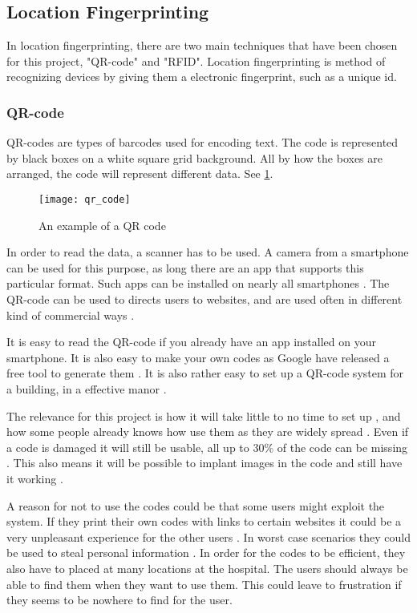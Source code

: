 \subsection{Location Fingerprinting}
In location fingerprinting, there are two main techniques that have been chosen for this project, "QR-code" and "RFID". Location fingerprinting is method of recognizing devices by giving them a electronic fingerprint, such as a unique id.

\subsubsection{QR-code} %
QR-codes are types of barcodes used for encoding text. The code is represented by black boxes on a white square grid background. All by how the boxes are arranged, the code will represent different data. See \cref{fig:qr}.

\begin{figure}
	\begin{center}
		\texttt{[image: qr\_code]}
	\end{center}
	\caption{An example of a QR code}
	\label{fig:qr}
\end{figure}	

In order to read the data, a scanner has to be used. A camera from a smartphone can be used for this purpose, as long there are an app that supports this particular format. Such apps can be installed on nearly all smartphones \cite{QR_smart}. The QR-code can be used to directs users to websites, and are used often in different kind of commercial ways \cite{QR_url}.

It is easy to read the QR-code if you already have an app installed on your smartphone. It is also easy to make your own codes as Google have released a free tool to generate them \cite{QR_Google}. It is also rather easy to set up a QR-code system for a building, in a effective manor \cite{QR_easy}.

The relevance for this project is how it will take little to no time to set up \cite{QR_rel1}, and how some people already knows how use them as they are widely spread \cite{QR_spread}. Even if a code is damaged it will still be usable, all up to 30\% of the code can be missing \cite{QR_dama}. This also means it will be possible to implant images in the code and still have it working \cite{QR_image}.

A reason for not to use the codes could be that some users might exploit the system. If they print their own codes with links to certain websites it could be a very unpleasant experience for the other users \cite{QR_urlbad}. In worst case scenarios they could be used to steal personal information \cite{QR_information}.
In order for the codes to be efficient, they also have to placed at many locations at the hospital. The users should always be able to find them when they want to use them. This could leave to frustration if they seems to be nowhere to find for the user.


